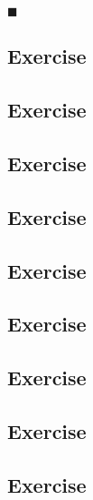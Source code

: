 \documentclass{article}
\begin{document}
$\blacksquare$

\subsection{Exercise}

\subsection{Exercise}

\subsection{Exercise}

\subsection{Exercise}

\subsection{Exercise}

\subsection{Exercise}

\subsection{Exercise}

\subsection{Exercise}

\subsection{Exercise}
\end{document}
